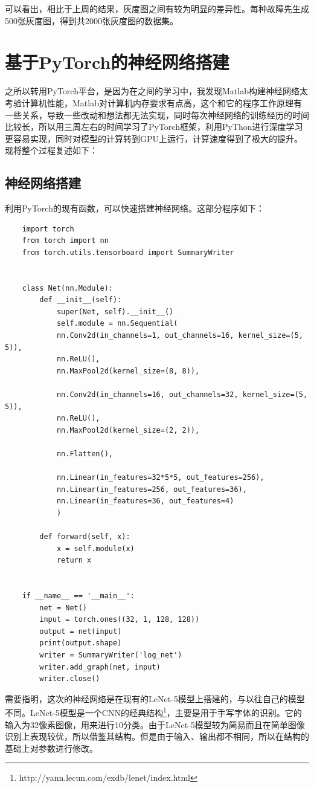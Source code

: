 \documentclass{article}
\begin{document}
	可以看出，相比于上周的结果，灰度图之间有较为明显的差异性。每种故障先生成500张灰度图，得到共2000张灰度图的数据集。
	
	\section{基于PyTorch的神经网络搭建}
	
	之所以转用PyTorch平台，是因为在之间的学习中，我发现Matlab构建神经网络太考验计算机性能，Matlab对计算机内存要求有点高，这个和它的程序工作原理有一些关系，导致一些改动和想法都无法实现，同时每次神经网络的训练经历的时间比较长，所以用三周左右的时间学习了PyTorch框架，利用PyThon进行深度学习更容易实现，同时对模型的计算转到GPU上运行，计算速度得到了极大的提升。现将整个过程复述如下：
	
	\subsection{神经网络搭建}
	
	利用PyTorch的现有函数，可以快速搭建神经网络。这部分程序如下：
	
	\begin{lstlisting}
	import torch
	from torch import nn
	from torch.utils.tensorboard import SummaryWriter
		
		
	class Net(nn.Module):
		def __init__(self):
			super(Net, self).__init__()
			self.module = nn.Sequential(
			nn.Conv2d(in_channels=1, out_channels=16, kernel_size=(5, 5)),
			nn.ReLU(),
			nn.MaxPool2d(kernel_size=(8, 8)),
		
			nn.Conv2d(in_channels=16, out_channels=32, kernel_size=(5, 5)),
			nn.ReLU(),
			nn.MaxPool2d(kernel_size=(2, 2)),
		
			nn.Flatten(),
		
			nn.Linear(in_features=32*5*5, out_features=256),
			nn.Linear(in_features=256, out_features=36),
			nn.Linear(in_features=36, out_features=4)
			)
		
		def forward(self, x):
			x = self.module(x)
			return x
		
		
	if __name__ == '__main__':
		net = Net()
		input = torch.ones((32, 1, 128, 128))
		output = net(input)
		print(output.shape)
		writer = SummaryWriter('log_net')
		writer.add_graph(net, input)
		writer.close()
	\end{lstlisting}
	
	需要指明，这次的神经网络是在现有的LeNet-5模型上搭建的，与以往自己的模型不同。LeNet-5模型是一个CNN的经典结构\footnote{http://yann.lecun.com/exdb/lenet/index.html}，主要是用于手写字体的识别。它的输入为32像素图像，用来进行10分类。由于LeNet-5模型较为简易而且在简单图像识别上表现较优，所以借鉴其结构。但是由于输入、输出都不相同，所以在结构的基础上对参数进行修改。
	
\end{document}
